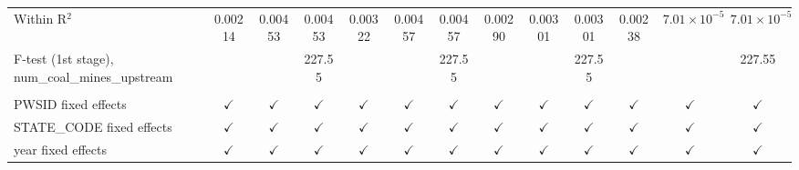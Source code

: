 \begin{table}[htbp]
\begin{adjustbox}{width = \textwidth, center}
\begin{tabular}{lcccccccccccc}
         Within R$^2$                                      & 0.00214       & 0.00453         & 0.00453       & 0.00322       & 0.00457         & 0.00457       & 0.00290       & 0.00301        & 0.00301       & 0.00238       & $7.01\times 10^{-5}$  & $7.01\times 10^{-5}$\\   
         F-test (1st stage), num\_coal\_mines\_upstream    &               &                 & 227.55        &               &                 & 227.55        &               &                & 227.55        &               &                       & 227.55\\  
          \\
         PWSID fixed effects                               & $\checkmark$  & $\checkmark$    & $\checkmark$  & $\checkmark$  & $\checkmark$    & $\checkmark$  & $\checkmark$  & $\checkmark$   & $\checkmark$  & $\checkmark$  & $\checkmark$          & $\checkmark$\\   
         STATE\_CODE fixed effects                         & $\checkmark$  & $\checkmark$    & $\checkmark$  & $\checkmark$  & $\checkmark$    & $\checkmark$  & $\checkmark$  & $\checkmark$   & $\checkmark$  & $\checkmark$  & $\checkmark$          & $\checkmark$\\   
         year fixed effects                                & $\checkmark$  & $\checkmark$    & $\checkmark$  & $\checkmark$  & $\checkmark$    & $\checkmark$  & $\checkmark$  & $\checkmark$   & $\checkmark$  & $\checkmark$  & $\checkmark$          & $\checkmark$\\   
         \bottomrule
      \end{tabular}
   \end{adjustbox}
\end{table}


